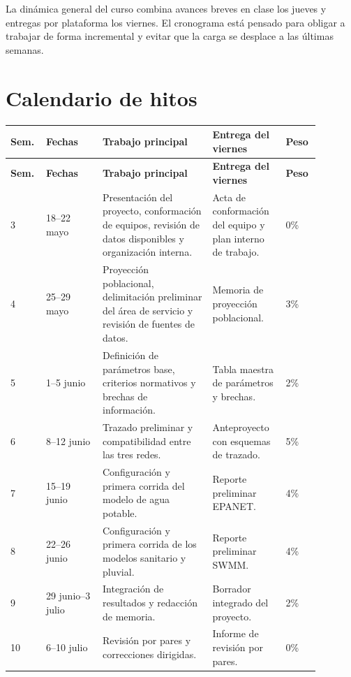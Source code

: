 \documentclass[11pt]{article}
\begin{document}

\begin{infobox}
La din\'amica general del curso combina avances breves en clase los jueves y entregas por plataforma los viernes. El cronograma est\'a pensado para obligar a trabajar de forma incremental y evitar que la carga se desplace a las \'ultimas semanas.
\end{infobox}

\section{Calendario de hitos}
\small
\begin{longtable}{p{0.08\linewidth} p{0.17\linewidth} p{0.33\linewidth} p{0.22\linewidth} p{0.08\linewidth}}
\toprule
\textbf{Sem.} & \textbf{Fechas} & \textbf{Trabajo principal} & \textbf{Entrega del viernes} & \textbf{Peso} \\
\midrule
\endfirsthead
\toprule
\textbf{Sem.} & \textbf{Fechas} & \textbf{Trabajo principal} & \textbf{Entrega del viernes} & \textbf{Peso} \\
\midrule
\endhead
3 & 18--22 mayo & Presentaci\'on del proyecto, conformaci\'on de equipos, revisi\'on de datos disponibles y organizaci\'on interna. & Acta de conformaci\'on del equipo y plan interno de trabajo. & 0\% \\
4 & 25--29 mayo & Proyecci\'on poblacional, delimitaci\'on preliminar del \'area de servicio y revisi\'on de fuentes de datos. & Memoria de proyecci\'on poblacional. & 3\% \\
5 & 1--5 junio & Definici\'on de par\'ametros base, criterios normativos y brechas de informaci\'on. & Tabla maestra de par\'ametros y brechas. & 2\% \\
6 & 8--12 junio & Trazado preliminar y compatibilidad entre las tres redes. & Anteproyecto con esquemas de trazado. & 5\% \\
7 & 15--19 junio & Configuraci\'on y primera corrida del modelo de agua potable. & Reporte preliminar EPANET. & 4\% \\
8 & 22--26 junio & Configuraci\'on y primera corrida de los modelos sanitario y pluvial. & Reporte preliminar SWMM. & 4\% \\
9 & 29 junio--3 julio & Integraci\'on de resultados y redacci\'on de memoria. & Borrador integrado del proyecto. & 2\% \\
10 & 6--10 julio & Revisi\'on por pares y correcciones dirigidas. & Informe de revisi\'on por pares. & 0\% \\

\end{longtable}
\end{document}
